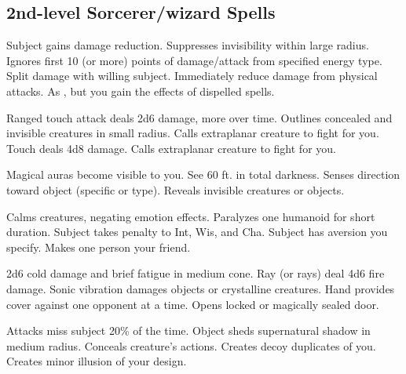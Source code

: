 \subsection{2nd-level Sorcerer/wizard Spells} 
\begin{swspelllist}
   Subject gains damage reduction.
   Suppresses invisibility within large radius.
   Ignores first 10 (or more) points of damage/attack from specified energy type.
   Split damage with willing subject.
   Immediately reduce damage from physical attacks.
   As , but you gain the effects of dispelled spells.

   Ranged touch attack deals 2d6 damage, more over time.
   Outlines concealed and invisible creatures in small radius.
   Calls extraplanar creature to fight for you.
   Touch deals 4d8 damage.
   Calls extraplanar creature to fight for you.

   Magical auras become visible to you.
   See 60 ft. in total darkness.
   Senses direction toward object (specific or type).
   Reveals invisible creatures or objects.
  \spellheadrestricted{}
  \spellheadrestricted{}

   Calms creatures, negating emotion effects.
   Paralyzes one humanoid for short duration.
   Subject takes  penalty to Int, Wis, and Cha.
   Subject has aversion you specify.
   Makes one person your friend.

   2d6 cold damage and brief fatigue in medium cone.
   Ray (or rays) deal 4d6 fire damage.
   Sonic vibration damages objects or crystalline creatures.
   Hand provides cover against one opponent at a time.
   Opens locked or magically sealed door.

   Attacks miss subject 20\% of the time.
   Object sheds supernatural shadow in medium radius.
   Conceals creature's actions. 
   Creates decoy duplicates of you.
   Creates minor illusion of your design.


\end{swspelllist}

